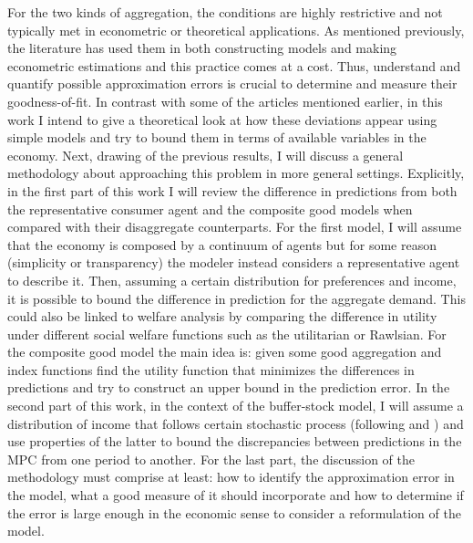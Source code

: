 \documentclass[english, a4paper,12pt]{article}
\begin{document}
For the two kinds of aggregation, the conditions are highly restrictive and not typically met in econometric or theoretical applications. As mentioned previously, the literature has used them in both constructing models and making econometric estimations and this practice comes at a cost. Thus, understand and quantify possible approximation errors is crucial to determine and measure their goodness-of-fit. In contrast with some of the articles mentioned earlier, in this work I intend to give a theoretical look at how these deviations appear using simple models and try to bound them in terms of available variables in the economy. Next, drawing of the previous results, I will discuss a general methodology about approaching this problem in more general settings. Explicitly, in the first part of this work I will review the difference in predictions from both the representative consumer agent and the composite good models when compared with their disaggregate counterparts. For the first model, I will assume that the economy is composed by a continuum of agents but for some reason (simplicity or transparency) the modeler instead considers a representative agent to describe it. Then, assuming a certain distribution for preferences and income, it is possible to bound the difference in prediction for the aggregate demand. This could also be linked to welfare analysis by comparing the difference in utility under different social welfare functions such as the utilitarian or Rawlsian. For the composite good model the main idea is: given some good aggregation and index functions find the utility function that minimizes the differences in predictions and try to construct an upper bound in the prediction error. In the second part of this work, in the context of the buffer-stock model, I will assume a distribution of income that follows certain stochastic process (following \cite{GabaixIncome} and \cite{OkFieldsIncome}) and use properties of the latter to bound the discrepancies between predictions in the MPC from one period to another. For the last part, the discussion of the methodology must comprise at least: how to identify the approximation error in the model, what a good measure of it should incorporate and how to determine if the error is large enough in the economic sense to consider a reformulation of the model. 

\newpage


\end{document}
